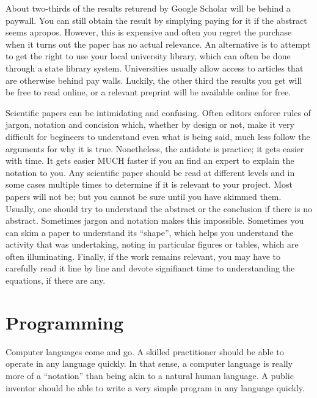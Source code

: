 \documentclass[
	fontsize=10pt, %
	twoside=false, %
	secnumdepth=1, %
]{kaobook}
\begin{document}
About two-thirds of the results returend by Google Scholar will be behind a paywall.
You can still obtain the result by simplying paying for it
if the abstract seems apropos.
However, this
is expensive and often you regret the purchase when it turns out the
paper has no actual relevance. An alternative is to attempt to get
the right to use your local university library, which can often be
done through a state library system. Universities usually allow
access to articles that are otherwise behind pay walls.
Luckily, the other third the results you get will be free to read online,
or a relevant preprint will be available online for free.

Scientific papers can be intimidating and confusing.
Often editors enforce rules of jargon, notation and concision which,
whether by design or not, make it very difficult for begineers to
understand even what is being said, much less follow the arguments for
why it is true.
Nonetheless, the antidote is practice; it gets easier with time.
It gets easier MUCH faster if you an find an expert to explain the notation to
you.
Any scientific paper should be read at different levels and in some cases
multiple times to determine if it is relevant to your project.
Most papers will not be; but you cannot be sure until you have skimmed them.
Usually, one should try to understand the abstract or the
conclusion if there is no abstract. Sometimes jargon and notation makes
this impossible. Sometimes you can skim a paper to understand its ``shape'', which
helps you understand the activity that was undertaking, noting in particular
figures or tables, which are often illuminating.
Finally, if the work remains relevant, you may have to carefully read it line
by line and devote signifianct time to understanding the equations, if there
are any.

\section{Programming}

Computer languages come and go. A skilled practitioner should be
able to operate in any language quickly. In that sense, a computer language
is really more of a ``notation'' than being akin to a natural human language.
A public inventor should be able to write a very simple program in
any language quickly.
\end{document}
